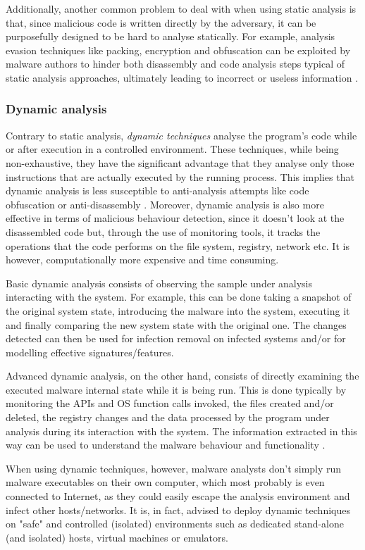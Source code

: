 \documentclass[pdfa%
,cucitura%
]{toptesi}
\begin{document}
Additionally, another common problem to deal with when using static analysis is that, since malicious code is written directly by the adversary, it can be purposefully designed to be hard to analyse statically. For example, analysis evasion techniques like packing, encryption and obfuscation can be exploited by malware authors to hinder both disassembly and code analysis steps typical of static analysis approaches, ultimately leading to incorrect or useless information \cite{NamanyaTWM}.

\subsubsection{Dynamic analysis}
Contrary to static analysis, \textit{dynamic techniques} analyse the program's code while or after execution in a controlled environment. These techniques, while being non-exhaustive, they have the significant advantage that they analyse only those instructions that are actually executed by the running process. This implies that dynamic analysis is less susceptible to anti-analysis attempts like code obfuscation or anti-disassembly \cite{BayerDAMC}. Moreover, dynamic analysis is also more effective in terms of malicious behaviour detection, since it doesn't look at the disassembled code but, through the use of monitoring tools, it tracks the operations that the code performs on the file system, registry, network etc. It is however, computationally more expensive and time consuming.

Basic dynamic analysis consists of observing the sample under analysis interacting with the system. For example, this can be done taking a snapshot of the original system state, introducing the malware into the system, executing it and finally comparing the new system state with the original one. The changes detected can then be used for infection removal on infected systems and/or for modelling effective signatures/features.

Advanced dynamic analysis, on the other hand, consists of directly examining the executed malware internal state while it is being run. This is done typically by monitoring the APIs and OS function calls invoked, the files created and/or deleted, the registry changes and the data processed by the program under analysis during its interaction with the system. The information extracted in this way can be used to understand the malware behaviour and functionality \cite{NamanyaTWM}.

When using dynamic techniques, however, malware analysts don't simply run malware executables on their own computer, which most probably is even connected to Internet, as they could easily escape the analysis environment and infect other hosts/networks. It is, in fact, advised to deploy dynamic techniques on "safe" and controlled (isolated) environments such as dedicated stand-alone (and isolated) hosts, virtual machines or emulators.
\end{document}

